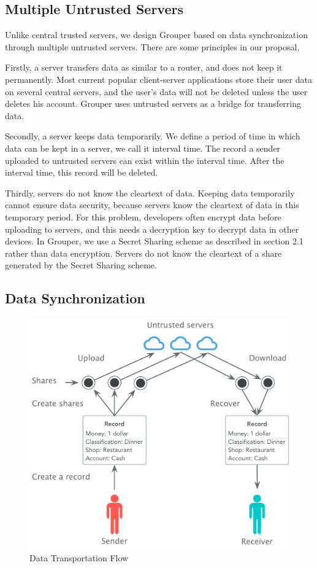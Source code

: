\documentclass[twocolumn,10pt]{article}
\begin{document}
\subsection{Multiple Untrusted Servers}

Unlike central trusted servers, we design Grouper based on data synchronization through multiple untrusted servers. There are some principles in our proposal. 

Firstly, a server transfers data as similar to a router, and does not keep it permanently. Most current popular client-server applications store their user data on several central servers, and the user's data will not be deleted unless the user deletes his account. Grouper uses untrusted servers as a bridge for transferring data.

Secondly, a server keeps data temporarily. We define a period of time in which data can be kept in a server, we call it interval time. The record a sender uploaded to untrusted servers can exist within the interval time. After the interval time, this record will be deleted.

Thirdly, servers do not know the cleartext of data. Keeping data temporarily cannot ensure data security, because servers know the cleartext of data in this temporary period. For this problem, developers often encrypt data before uploading to servers, and this needs a decryption key to decrypt data in other devices. In Grouper, we use a Secret Sharing scheme as described in section 2.1 rather than data encryption. Servers do not know the cleartext of a share generated by the Secret Sharing scheme.

\subsection{Data Synchronization}

\begin{figure}[!htb]
	\centering
	\includegraphics[scale=0.38]{sync_flow}
	\caption{Data Transportation Flow}
\end{figure}
\end{document}
